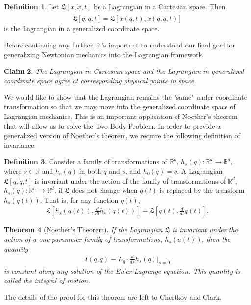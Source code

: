 \documentclass[10pt, psamsfonts]{amsart}
\newtheorem{thm}{Theorem}[section]
\newtheorem{claim}[thm]{Claim}
\theoremstyle{definition}
\newtheorem{defn}[thm]{Definition}
\theoremstyle{remark}
\numberwithin{equation}{section}
\begin{document}
\begin{defn}
Let $\mathfrak{L}[x, \dot{x}, t]$ be a Lagrangian in a Cartesian space. Then, 
\begin{align*}
  \tilde{\mathfrak{L}}[q, \dot{q}, t] = \mathfrak{L}[x(q,t), \dot{x}(q, \dot{q}, t)] 
\end{align*}
is the Lagrangian in a generalized coordinate space. 
\end{defn}

Before continuing any further, it's important to understand our final goal for generalizing Newtonian mechanics into the Lagrangian framework. 
\begin{claim}
  The Lagrangian in Cartesian space and the Lagrangian in generalized coordinate space agree at corresponding physical points in space.
\end{claim}
We would like to show that the Lagrangian remains the "same" under coordinate transformation so that we may move into the generalized coordinate space of Lagrangian mechanics. This is an important application of Noether's theorem that will allow us to solve the Two-Body Problem. In order to provide a generalized version of Noether's theorem, we require the following definition of invariance:

\begin{defn}
Consider a family of transformations of $\mathbb{R}^d$, $h_s(q):\mathbb{R}^d \to \mathbb{R}^d $, where $s \in \mathbb{R}$ and $h_s(q)$ in both $q$ and $s$, and $h_0(q) = q$. A Lagrangian $\mathfrak{L}[q, \dot{q}, t]$ is invariant under the action of the family of transformations of $\mathbb{R}^d$, $h_s(q): \mathbb{R}^n \to \mathbb{R}^d$, if $\mathfrak{L}$ does not change when $q(t)$ is replaced by the transform $h_s(q(t))$. That is, for any function $q(t)$,
\begin{align*}
  \mathfrak{L}[h_s(q(t)), \frac{d}{dt} h_s(q(t))] = \mathfrak{L}[q(t), \frac{d}{dt} q(t)].
\end{align*}
\end{defn}

\begin{thm}[Noether's Theorem]
If the Lagrangian $\mathfrak{L}$ is invariant under the action of a one-parameter family of transformations, $h_s(u(t))$, then the quantity
\begin{align*}
  I(q, \dot{q}) \equiv L_{\dot{q}} \cdot \frac{d}{ds} h_s(q) \bigg|_{s=0}
\end{align*}
is constant along any solution of the Euler-Lagrange equation. This quantity is called the integral of motion.
\end{thm}
\noindent The details of the proof for this theorem are left to Chertkov and Clark.\\
\end{document}
